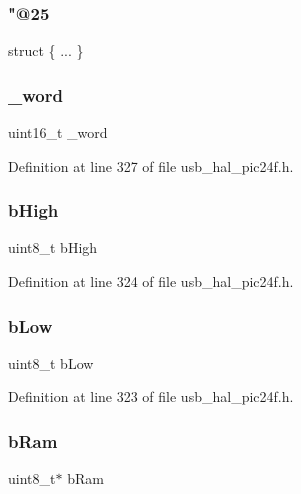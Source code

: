 \subsubsection{\texorpdfstring{"@25}{@25}}
{\footnotesize\ttfamily struct \{ ... \} }

\mbox{\label{union___p_o_i_n_t_e_r_a957c357acebf129016c23a180c55a138}} 
\subsubsection{\texorpdfstring{\_word}{\_word}}
{\footnotesize\ttfamily uint16\+\_\+t \+\_\+word}



Definition at line 327 of file usb\+\_\+hal\+\_\+pic24f.\+h.

\mbox{\label{union___p_o_i_n_t_e_r_a9415d74951bbdb3ae28bc33b5db7d1e2}} 
\subsubsection{\texorpdfstring{bHigh}{bHigh}}
{\footnotesize\ttfamily uint8\+\_\+t b\+High}



Definition at line 324 of file usb\+\_\+hal\+\_\+pic24f.\+h.

\mbox{\label{union___p_o_i_n_t_e_r_a4fd529a929a6e33cb6216934961a8cf0}} 
\subsubsection{\texorpdfstring{bLow}{bLow}}
{\footnotesize\ttfamily uint8\+\_\+t b\+Low}



Definition at line 323 of file usb\+\_\+hal\+\_\+pic24f.\+h.

\mbox{\label{union___p_o_i_n_t_e_r_ade44ba3aaf3f950f4c95a2eae3c52266}} 
\subsubsection{\texorpdfstring{bRam}{bRam}}
{\footnotesize\ttfamily uint8\+\_\+t$\ast$ b\+Ram}



